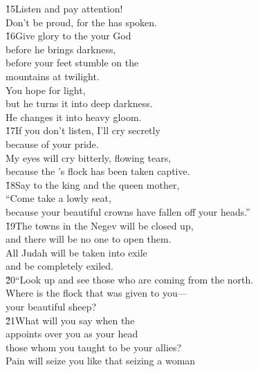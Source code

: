 \begin{poetry}
\poeml \v{15}Listen and pay attention! \\
\poemll    Don't be proud, for the  has spoken. \\
\poeml \v{16}Give glory to the  your God \\
\poemll    before he brings darkness, \\
\poeml before your feet stumble on the \\
\poemll    mountains at twilight. \\
\poeml You hope for light, \\
\poemll    but he turns it into deep darkness. \\
\poemlll       He changes it into heavy gloom. \\
\poeml \v{17}If you don't listen, I'll cry secretly \\
\poemll    because of your pride. \\
\poeml My eyes will cry bitterly, flowing tears, \\
\poemll    because the 's flock has been taken captive. \\
\poeml \v{18}Say to the king and the queen mother, \\
\poemll    ``Come take a lowly seat, \\
\poeml because your beautiful crowns have fallen off your heads.'' \\
\poeml \v{19}The towns in the Negev will be closed up, \\
\poemll    and there will be no one to open them. \\
\poeml All Judah will be taken into exile \\
\poemll    and be completely exiled. \\
\poeml \v{20}``Look up and see those who are coming from the north. \\
\poemll    Where is the flock that was given to you--- \\
\poemlll       your beautiful sheep? \\
\poeml \v{21}What will you say when the  \\
\poemll    appoints over you as your head \\
\poemlll       those whom you taught to be your allies? \\
\poeml Pain will seize you like that seizing a woman \\

\end{poetry}

